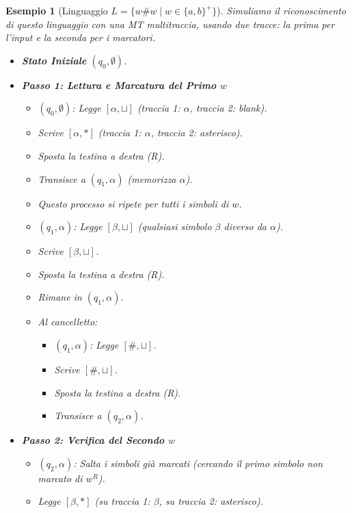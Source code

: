\documentclass[a4paper]{article}
\newtheorem{example}{Esempio}
\begin{document}
\begin{example}[Linguaggio $L = \{w\#w \mid w \in \{a,b\}^+\}$]
Simuliamo il riconoscimento di questo linguaggio con una MT multitraccia, usando due tracce: la prima per l'input e la seconda per i marcatori.
\begin{itemize}
    \item \textbf{Stato Iniziale} $(q_0, \emptyset)$.
    \item \textbf{Passo 1: Lettura e Marcatura del Primo $w$}
        \begin{itemize}
            \item $(q_0, \emptyset)$: Legge $[\alpha, \sqcup]$ (traccia 1: $\alpha$, traccia 2: blank).
            \item Scrive $[\alpha, *]$ (traccia 1: $\alpha$, traccia 2: asterisco).
            \item Sposta la testina a destra (R).
            \item Transisce a $(q_1, \alpha)$ (memorizza $\alpha$).
            \item Questo processo si ripete per tutti i simboli di $w$.
            \item $(q_1, \alpha)$: Legge $[\beta, \sqcup]$ (qualsiasi simbolo $\beta$ diverso da $\alpha$).
            \item Scrive $[\beta, \sqcup]$.
            \item Sposta la testina a destra (R).
            \item Rimane in $(q_1, \alpha)$.
            \item Al cancelletto:
                \begin{itemize}
                    \item $(q_1, \alpha)$: Legge $[\#, \sqcup]$.
                    \item Scrive $[\#, \sqcup]$.
                    \item Sposta la testina a destra (R).
                    \item Transisce a $(q_2, \alpha)$.
                \end{itemize}
        \end{itemize}
    \item \textbf{Passo 2: Verifica del Secondo $w$}
        \begin{itemize}
            \item $(q_2, \alpha)$: Salta i simboli già marcati (cercando il primo simbolo non marcato di $w^R$).
            \item Legge $[\beta, *]$ (su traccia 1: $\beta$, su traccia 2: asterisco).

\end{itemize}
\end{itemize}
\end{example}
\end{document}
